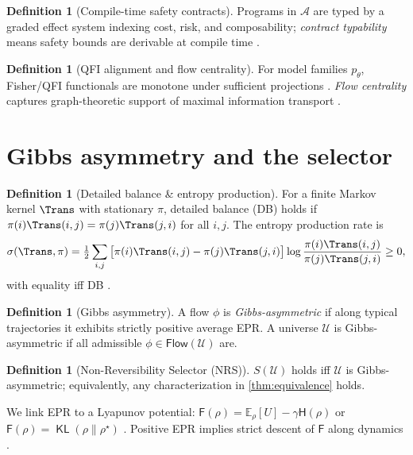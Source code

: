 \documentclass[11pt]{article}
\theoremstyle{plain}
\theoremstyle{definition}
\newtheorem{definition}[theorem]{Definition}
\theoremstyle{remark}
\DeclareMathOperator{\KL}{\mathsf{KL}}
\newcommand{\EE}{\mathbb{E}}
\newcommand{\1}{\mathds{1}}
\newcommand{\Flows}{\mathsf{Flow}}
\newcommand{\U}{\mathcal{U}}
\newcommand{\A}{\mathcal{A}}
\newcommand{\Free}{\mathsf{F}}
\newcommand{\EP}{\sigma} %
\newcommand{\dH}{\mathsf{H}} %
\begin{document}
\begin{definition}[Compile-time safety contracts]
Programs in $\A$ are typed by a graded effect system indexing cost, risk, and composability; \emph{contract typability} means safety bounds are derivable at compile time \cite{GradedEffects2025,MeasureContracts2025}.
\end{definition}

\begin{definition}[QFI alignment and flow centrality]
For model families $p_\theta$, Fisher/QFI functionals are monotone under sufficient projections \cite{AmariNagaoka2000,Petz2002,CoverThomas2006}. \emph{Flow centrality} captures graph-theoretic support of maximal information transport \cite{FlowCentrality2025}.
\end{definition}

\section{Gibbs asymmetry and the selector}
\begin{definition}[Detailed balance \& entropy production]
For a finite Markov kernel $\Trans$ with stationary $\pi$, detailed balance (DB) holds if $\pi(i)\Trans(i,j)=\pi(j)\Trans(j,i)$ for all $i,j$. The entropy production rate is
\[
\EP(\Trans,\pi)=\tfrac12 \sum_{i,j}\big[\pi(i)\Trans(i,j)-\pi(j)\Trans(j,i)\big]\log\frac{\pi(i)\Trans(i,j)}{\pi(j)\Trans(j,i)}\ge 0,
\]
with equality iff DB \cite{Schnakenberg1976,LebowitzSpohn1999,Seifert2012,MaesNetocny2003}.
\end{definition}

\begin{definition}[Gibbs asymmetry]
A flow $\phi$ is \emph{Gibbs-asymmetric} if along typical trajectories it exhibits strictly positive average EPR. A universe $\U$ is Gibbs-asymmetric if all admissible $\phi\in\Flows(\U)$ are.
\end{definition}

\begin{definition}[Non-Reversibility Selector (NRS)]
$S(\U)$ holds iff $\U$ is Gibbs-asymmetric; equivalently, any characterization in \cref{thm:equivalence} holds.
\end{definition}

We link EPR to a Lyapunov potential: $\Free(\rho)=\EE_\rho[U]-\gamma\dH(\rho)$ or $\Free(\rho)=\KL(\rho\|\rho^\star)$ \cite{CoverThomas2006,JordanKinderlehrerOtto1998}. Positive EPR implies strict descent of $\Free$ along dynamics \cite{Seifert2012}.
\end{document}
